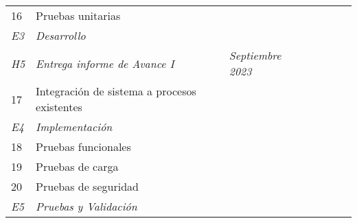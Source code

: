 \begin{longtable}[c]{@{}llllllll@{}}
	16                                     & Pruebas unitarias                                   &                                              &                                          &               &                &                  &                 \\
	\textit{E3}                            & \textit{Desarrollo}                                 & \textit{}                                    & \textit{}                                & \textit{}     & \textit{}      & \textit{}        & \textit{}       \\
	\textit{H5}                            & \textit{Entrega informe de Avance I}                & \multicolumn{2}{l}{\textit{Septiembre 2023}} & \textit{}                                & \textit{}     & \textit{}      & \textit{}                          \\
	17                                     & Integración de sistema a procesos existentes        &                                              &                                          &               &                &                  &                 \\
	\textit{E4}                            & \textit{Implementación}                             & \textit{}                                    & \textit{}                                & \textit{}     & \textit{}      & \textit{}        & \textit{}       \\
	18                                     & Pruebas funcionales                                 &                                              &                                          &               &                &                  &                 \\
	19                                     & Pruebas de carga                                    &                                              &                                          &               &                &                  &                 \\
	20                                     & Pruebas de seguridad                                &                                              &                                          &               &                &                  &                 \\
	\textit{E5}                            & \textit{Pruebas y Validación}                       & \textit{}                                    & \textit{}                                & \textit{}     & \textit{}      & \textit{}        & \textit{}       \\

\end{longtable}
